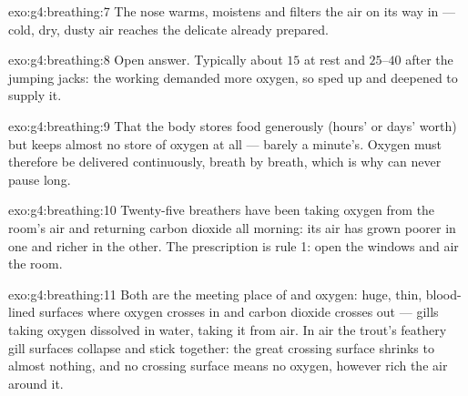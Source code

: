 \begin{solution}{exo:g4:breathing:7}
The nose warms, moistens and filters the air on its way in ---
cold, dry, dusty air reaches the delicate  already
prepared.
\end{solution}

\begin{solution}{exo:g4:breathing:8}
Open answer. Typically about $15$ at rest and $25$--$40$ after
the jumping jacks: the working  demanded more oxygen,
so  sped up and deepened to supply it.
\end{solution}

\begin{solution}{exo:g4:breathing:9}
That the body stores food generously (hours' or days' worth)
but keeps almost no store of oxygen at all --- barely a
minute's. Oxygen must therefore be delivered continuously,
breath by breath, which is why  can never pause long.
\end{solution}

\begin{solution}{exo:g4:breathing:10}
Twenty-five breathers have been taking oxygen from the room's
air and returning carbon dioxide all morning: its air has
grown poorer in one and richer in the other. The prescription
is rule 1: open the windows and air the room.
\end{solution}

\begin{solution}{exo:g4:breathing:11}
Both are the meeting place of  and oxygen: huge, thin,
blood-lined surfaces where oxygen crosses in and carbon
dioxide crosses out --- gills taking oxygen dissolved in
water,  taking it from air. In air the trout's feathery
gill surfaces collapse and stick together: the great crossing
surface shrinks to almost nothing, and no crossing surface
means no oxygen, however rich the air around it.
\end{solution}
